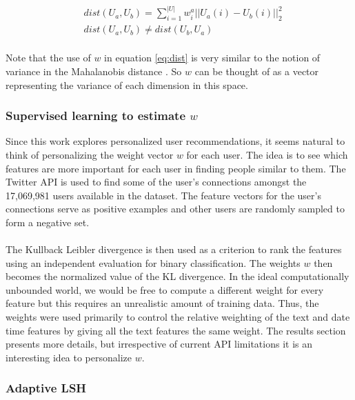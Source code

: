 \documentclass{article}
\begin{document}
\begin{center}
\begin{align}
\label{eq:dist}
&dist(U_a,U_b) = \sum_{i=1}^{|U|}w_{i}^{a}||U_a(i)-U_b(i)||_{2}^2 \\
&dist(U_a,U_b) \neq dist(U_b,U_a) \\
\end{align}
\end{center}

Note that the use of $w$ in equation \ref{eq:dist} is very similar to the notion of
variance in the Mahalanobis distance \cite{mahal}. So $w$ can be thought of as a vector
representing the variance of each dimension in this space.

\subsubsection{Supervised learning to estimate $w$}

Since this work explores personalized user recommendations, it seems natural to think of 
personalizing the weight vector $w$ for each user. The idea is to see which features are
more important for each user in finding people similar to them. The Twitter API \cite{api}
is used to find some of the user's connections amongst the 17,069,981 users available in the dataset.
The feature vectors for the user's connections serve as positive examples and other users
are randomly sampled to form a negative set. \\\\
The Kullback Leibler divergence \cite{kl} is then used
as a criterion to rank the features using an independent evaluation for binary classification.
The weights $w$ then becomes the normalized value of the KL divergence. In the ideal 
computationally unbounded world, we would be free to compute a different weight for every
feature but this requires an unrealistic amount of training data. Thus, the weights were
used primarily to control the relative weighting of the text and date time features by giving
all the text features the same weight. The results section presents more details, 
but irrespective of current API limitations it is an interesting idea to personalize $w$.

\subsubsection{Adaptive LSH}
\end{document}
